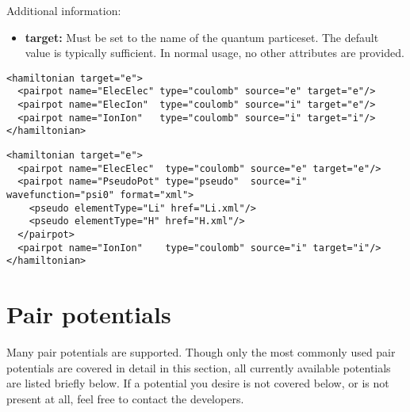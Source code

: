 Additional information:
\begin{itemize}
  \item{\textbf{target:} Must be set to the name of the quantum particeset.  The default value is typically sufficient.  In normal usage, no other attributes are provided.}
\end{itemize}

\begin{lstlisting}[caption=All electron Hamiltonian XML element.]
<hamiltonian target="e">
  <pairpot name="ElecElec" type="coulomb" source="e" target="e"/>
  <pairpot name="ElecIon"  type="coulomb" source="i" target="e"/>
  <pairpot name="IonIon"   type="coulomb" source="i" target="i"/>
</hamiltonian>
\end{lstlisting}


\begin{lstlisting}[caption=Pseudopotential Hamiltonian XML element.]
<hamiltonian target="e">
  <pairpot name="ElecElec"  type="coulomb" source="e" target="e"/>
  <pairpot name="PseudoPot" type="pseudo"  source="i" wavefunction="psi0" format="xml">
    <pseudo elementType="Li" href="Li.xml"/>
    <pseudo elementType="H" href="H.xml"/>
  </pairpot>
  <pairpot name="IonIon"    type="coulomb" source="i" target="i"/>
</hamiltonian>
\end{lstlisting}


\section{Pair potentials}

Many pair potentials are supported.  Though only the most commonly used pair potentials are covered in detail in this section, all currently available potentials are listed briefly below.  If a potential you desire is not covered below, or is not present at all, feel free to contact the developers.

